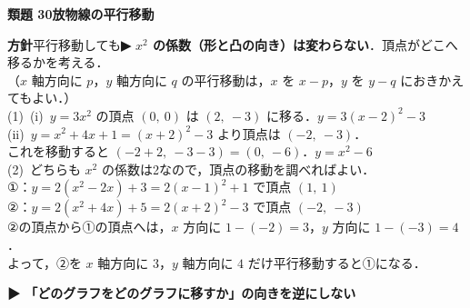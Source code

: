 \documentclass[a4paper,11pt]{ltjsarticle}
\newcommand{\ans}[2]{\Needspace{5\baselineskip}\vspace{6pt}%
  {\sffamily\bfseries 類題 #1\quad #2}\par}
\newcommand{\point}[1]{\textsf{\bfseries ▶ #1}}
\newcommand{\ax}[4]{\draw[->] (#1,0)--(#2,0) node[right]{\scriptsize $x$};
  \draw[->] (0,#3)--(0,#4) node[above]{\scriptsize $y$};
  \node[below left] at (0,0){\scriptsize O};}
\begin{document}
\ans{30}{放物線の平行移動}
\begin{kai}
\textbf{方針}\quad 平行移動しても\point{$x^2$ の係数（形と凸の向き）は変わらない}．頂点がどこへ移るかを考える．\\
（$x$ 軸方向に $p$，$y$ 軸方向に $q$ の平行移動は，$x$ を $x-p$，$y$ を $y-q$ におきかえてもよい．）\\[2pt]
(1)\ (i)\ $y=3x^2$ の頂点 $(0,\ 0)$ は $(2,\ -3)$ に移る．\quad $y=3(x-2)^2-3$\\
\hspace*{1.5em}(ii)\ $y=x^2+4x+1=(x+2)^2-3$ より頂点は $(-2,\ -3)$．\\
\hspace*{1.5em}これを移動すると $(-2+2,\ -3-3)=(0,\ -6)$．\quad $y=x^2-6$\\[2pt]
(2)\ どちらも $x^2$ の係数は2なので，頂点の移動を調べればよい．\\
\hspace*{1.5em}①：$y=2(x^2-2x)+3=2(x-1)^2+1$ で頂点 $(1,\ 1)$\\
\hspace*{1.5em}②：$y=2(x^2+4x)+5=2(x+2)^2-3$ で頂点 $(-2,\ -3)$\\
\hspace*{1.5em}②の頂点から①の頂点へは，$x$ 方向に $1-(-2)=3$，$y$ 方向に $1-(-3)=4$．\\
\hspace*{1.5em}よって，②を $x$ 軸方向に $3$，$y$ 軸方向に $4$ だけ平行移動すると①になる．\\
\begin{center}
\end{center}
\hspace*{1.5em}\point{「どのグラフをどのグラフに移すか」の向きを逆にしない}
\end{kai}
\end{document}
